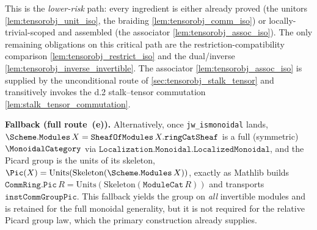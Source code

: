 \begin{lemma}
  This is the \emph{lower-risk} path: every ingredient is either already proved
  (the unitors \cref{lem:tensorobj_unit_iso}, the braiding
  \cref{lem:tensorobj_comm_iso}) or locally-trivial-scoped and assembled (the
  associator \cref{lem:tensorobj_assoc_iso}). The only remaining obligations on this
  critical path are the restriction-compatibility comparison
  \cref{lem:tensorobj_restrict_iso} and the
  dual/inverse \cref{lem:tensorobj_inverse_invertible}. The associator
  \cref{lem:tensorobj_assoc_iso} is supplied by the unconditional route of
  \cref{sec:tensorobj_stalk_tensor} and transitively invokes the d.2 stalk--tensor
  commutation \cref{lem:stalk_tensor_commutation}.

  \textbf{Fallback (full route~(e)).} Alternatively, once
  \texttt{jw\_ismonoidal} lands, \(\Scheme.\mathtt{Modules}\,X =
  \mathtt{SheafOfModules}\,X.\mathtt{ringCatSheaf}\) is a full (symmetric)
  \(\MonoidalCategory\) via \(\mathtt{Localization.Monoidal.LocalizedMonoidal}\),
  and the Picard group is the units of its skeleton,
  \(\Pic(X) = \mathrm{Units}(\mathrm{Skeleton}(\Scheme.\mathtt{Modules}\,X))\),
  exactly as Mathlib builds \(\mathtt{CommRing.Pic}\,R =
  \mathrm{Units}(\mathrm{Skeleton}(\mathtt{ModuleCat}\,R))\) and transports
  \(\mathtt{instCommGroupPic}\). This fallback yields the group on \emph{all}
  invertible modules and is retained for the full monoidal generality, but it is
  not required for the relative Picard group law, which the primary construction
  already supplies.
\end{lemma}

